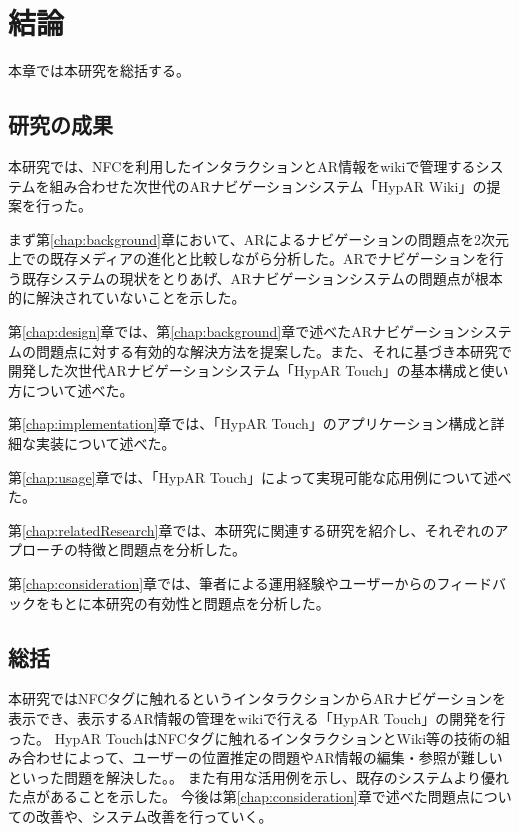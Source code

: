 \chapter{結論}
\label{chap:conclusion}

本章では本研究を総括する。

\newpage



\section{研究の成果}
本研究では、NFCを利用したインタラクションとAR情報をwikiで管理するシステムを組み合わせた次世代のARナビゲーションシステム「HypAR Wiki」の提案を行った。

まず第\ref{chap:background}章において、ARによるナビゲーションの問題点を2次元上での既存メディアの進化と比較しながら分析した。ARでナビゲーションを行う既存システムの現状をとりあげ、ARナビゲーションシステムの問題点が根本的に解決されていないことを示した。

第\ref{chap:design}章では、第\ref{chap:background}章で述べたARナビゲーションシステムの問題点に対する有効的な解決方法を提案した。また、それに基づき本研究で開発した次世代ARナビゲーションシステム「HypAR Touch」の基本構成と使い方について述べた。

第\ref{chap:implementation}章では、「HypAR Touch」のアプリケーション構成と詳細な実装について述べた。

第\ref{chap:usage}章では、「HypAR Touch」によって実現可能な応用例について述べた。

第\ref{chap:relatedResearch}章では、本研究に関連する研究を紹介し、それぞれのアプローチの特徴と問題点を分析した。

第\ref{chap:consideration}章では、筆者による運用経験やユーザーからのフィードバックをもとに本研究の有効性と問題点を分析した。

\section{総括}
本研究ではNFCタグに触れるというインタラクションからARナビゲーションを表示でき、表示するAR情報の管理をwikiで行える「HypAR Touch」の開発を行った。
HypAR TouchはNFCタグに触れるインタラクションとWiki等の技術の組み合わせによって、ユーザーの位置推定の問題やAR情報の編集・参照が難しいといった問題を解決した。。
また有用な活用例を示し、既存のシステムより優れた点があることを示した。
今後は第\ref{chap:consideration}章で述べた問題点についての改善や、システム改善を行っていく。